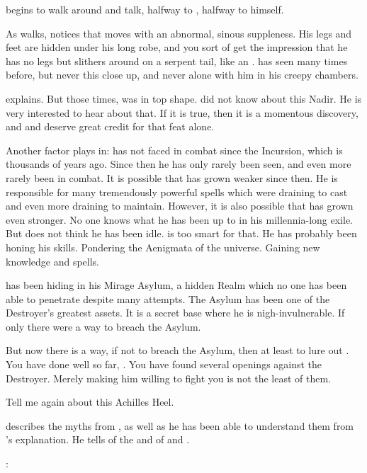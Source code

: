 \Azraid begins to walk around and talk, halfway to \Teshrial, halfway to himself.

As \Azraid walks, \Teshrial notices that \Azraid moves with an abnormal, sinous suppleness. 
His legs and feet are hidden under his long robe, and you sort of get the impression that he has no legs but slithers around on a serpent tail, like an \ophidian. 
\Teshrial has seen \Azraid many times before, but never this close up, and never alone with him in his creepy chambers. 

\Azraid explains. 
But those times, \Ishnaruchaefir was in top shape. 
\Azraid did not know about this Nadir.
He is very interested to hear about that. 
If it is true, then it is a momentous discovery, and \Teshrial and \Urizeth deserve great credit for that feat alone. 

Another factor plays in:
\Azraid has not faced \Ishnaruchaefir in combat since the Incursion, which is thousands of years ago. 
Since then he has only rarely been seen, and even more rarely been in combat. 
It is possible that \Ishnaruchaefir has grown weaker since then.
He is responsible for many tremendously powerful spells which were draining to cast and even more draining to maintain. 
However, it is also possible that \Ishnaruchaefir has grown even stronger. 
No one knows what he has been up to in his millennia-long exile. 
But \Azraid does not think he has been idle.
\Ishnaruchaefir is too smart for that. 
He has probably been honing his skills. 
Pondering the Aenigmata of the universe.
Gaining new knowledge and spells. 

\Ishnaruchaefir has been hiding in his Mirage Asylum, a hidden Realm which no one has been able to penetrate despite many attempts. 
The Asylum has been one of the Destroyer's greatest assets. 
It is a secret base where he is nigh-invulnerable. 
If only there were a way to breach the Asylum. 

But now there is a way, if not to breach the Asylum, then at least to lure out \Ishnaruchaefir. 
You have done well so far, \Teshrial.
You have found several openings against the Destroyer. 
Merely making him willing to fight you is not the least of them. 

Tell me again about this Achilles Heel. 

\Teshrial describes the myths from \WanderersInDarknessEmph, as well as he has been able to understand them from \Urizeth's explanation.
He tells \Azraid of the \malgryph and of \Zaz and \Urzaz. 

\Teshrial: 

